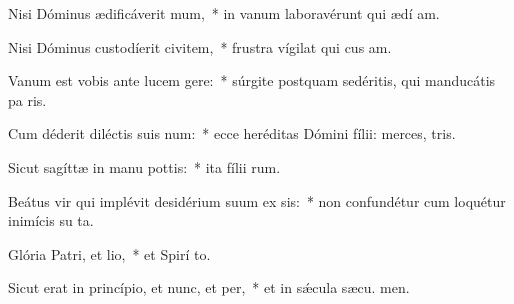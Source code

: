 \item Nisi Dóminus ædificáverit mum,~* in vanum laboravérunt qui ædí am.
\item Nisi Dóminus custodíerit civitem,~* frustra vígilat qui cus am.
\item Vanum est vobis ante lucem gere:~* súrgite postquam sedéritis, qui manducátis pa ris.
\item Cum déderit diléctis suis num:~* ecce heréditas Dómini fílii: merces,  tris.
\item Sicut sagíttæ in manu pottis:~* ita fílii rum.
\item Beátus vir qui implévit desidérium suum ex sis:~* non confundétur cum loquétur inimícis su  ta.
\item Glória Patri, et lio,~* et Spirí to.
\item Sicut erat in princípio, et nunc, et per,~* et in sǽcula sæcu. men.
